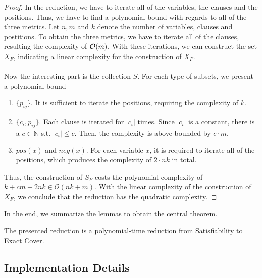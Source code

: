 \begin{proof}
    In the reduction, we have to iterate all of the variables, the clauses and the positions. 
    Thus, we have to find a polynomial bound with regards to all of the three metrics. Let $n, m$ and $k$ denote 
    the number of variables, clauses and postitions. To obtain the three metrics, we have to iterate 
    all of the clauses, resulting the complexity of $\mathcal{O}({m})$. With these iterations, we can construct the set $X_F$,
    indicating a linear complexity for the construction of $X_F$. \\\\
    Now the interesting part is the collection $S$. For each type of subsets, we present a polynomial bound 
\begin{enumerate}
    \item $\{p_{ij}\}$. It is sufficient to iterate the positions, requiring the complexity of $k$.
    \item $\{c_i, p_{ij}\}$. Each clause is iterated for $|c_i|$ times. Since $|c_i|$ is a constant, there is a $c \in \mathbb{N}$ 
    s.t. $|c_i| \leq c$. Then, the complexity is above bounded by $c \cdot m$.
    \item $pos(x)$ and $neg(x)$. For each variable $x$, it is required to iterate all of the positions, which produces the complexity 
    of $2 \cdot nk$ in total.
\end{enumerate}
Thus, the construction of $S_F$ costs the polynomial complexity of $k + cm + 2nk \in \mathcal{O}(nk + m)$. 
With the linear complexity of the construction of $X_F$, we conclude that the reduction has the quadratic complexity.
\end{proof}
In the end, we summarize the lemmas to obtain the central theorem.
\begin{theorem}
    The presented reduction is a polynomial-time reduction from Satisfiability to Exact Cover.
\end{theorem}

\subsection{Implementation Details}
\label{sec:sat-imp}
